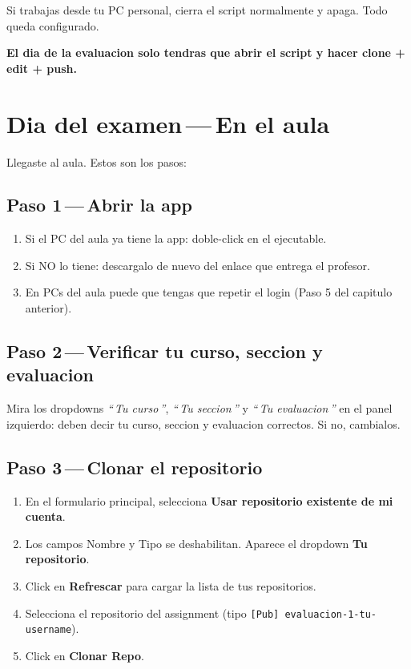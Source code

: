 \documentclass[11pt,a4paper,oneside]{report}
\begin{document}
Si trabajas desde tu PC personal, cierra el script normalmente y apaga. Todo queda configurado.

\textbf{El dia de la evaluacion solo tendras que abrir el script y hacer clone + edit + push.}

\chapter{Dia del examen\,---\,En el aula}

Llegaste al aula. Estos son los pasos:

\section{Paso 1\,---\,Abrir la app}

\begin{enumerate}
  \item Si el PC del aula ya tiene la app: doble-click en el ejecutable.
  \item Si NO lo tiene: descargalo de nuevo del enlace que entrega el profesor.
  \item En PCs del aula puede que tengas que repetir el login (Paso 5 del capitulo anterior).
\end{enumerate}

\section{Paso 2\,---\,Verificar tu curso, seccion y evaluacion}

Mira los dropdowns \emph{\textquotedblleft\,Tu curso\,\textquotedblright}, \emph{\textquotedblleft\,Tu seccion\,\textquotedblright} y \emph{\textquotedblleft\,Tu evaluacion\,\textquotedblright} en el panel izquierdo: deben decir tu curso, seccion y evaluacion correctos. Si no, cambialos.

\section{Paso 3\,---\,Clonar el repositorio}

\begin{enumerate}
  \item En el formulario principal, selecciona \textbf{Usar repositorio existente de mi cuenta}.
  \item Los campos Nombre y Tipo se deshabilitan. Aparece el dropdown \textbf{Tu repositorio}.
  \item Click en \textbf{Refrescar} para cargar la lista de tus repositorios.
  \item Selecciona el repositorio del assignment (tipo \texttt{[Pub] evaluacion-1-tu-username}).
  \item Click en \textbf{Clonar Repo}.
\end{enumerate}
\end{document}
